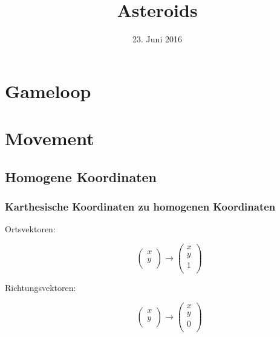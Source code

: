 \documentclass{article}
\title{Asteroids}
\date{23. Juni 2016}
\begin{document}
\maketitle

\section{Gameloop}

\section{Movement}
\subsection{Homogene Koordinaten}
\subsubsection{Karthesische Koordinaten zu homogenen Koordinaten}
\begin{description}
 \item[Ortsvektoren:]
  \begin{equation}
   \left(\begin{array}{c}
    x \\
    y \\
   \end{array}\right)
   \rightarrow
   \left(\begin{array}{c}
    x \\
    y \\
    1 \\
   \end{array}\right)
  \end{equation}

 \item[Richtungsvektoren:]
  \begin{equation}
   \left(\begin{array}{c}
    x \\
    y \\
   \end{array}\right)
   \rightarrow
   \left(\begin{array}{c}
    x \\
    y \\
    0 \\
   \end{array}\right)
  \end{equation}
\end{description}
\end{document}
